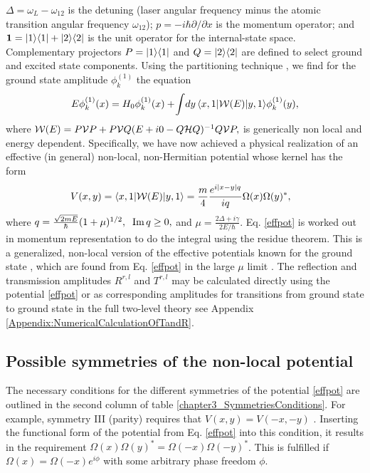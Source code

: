$\Delta=\omega_{L}-\omega_{12}$
is the detuning (laser angular frequency minus the atomic transition
angular frequency $\omega_{12}$);
${p}=-i\hbar\partial/\partial x$ is the momentum operator;
and ${\bf 1}=|1\rangle\langle 1|+|2\rangle\langle 2|$ is the unit operator
for the internal-state space.
Complementary projectors
%
$P=|1\rangle\langle 1|$ and $Q=|2\rangle\langle 2|$
%
are defined to select ground and excited state components.
Using the partitioning
technique \cite{Feshbach1958,Feshbach1962,Levine1969},
we find for the ground
state amplitude $\phi_k^{(1)}$ the equation
%
\begin{equation}\label{effecti}
	E\phi_k^{(1)}(x) = H_0\phi_k^{(1)}(x)+\!
	\int\! dy\, \la x,1|{\cal W}(E)|y,1\ra \phi_k^{(1)}(y),
\end{equation}
%
where
%
$
{\cal W}(E)=P{\cal V}P+P{\cal V}Q(E+i0-Q{\cal H}Q)^{-1}Q{\cal V}P,
$
%
is generically non local and energy dependent. Specifically, we have now achieved
a physical realization of an effective (in general) non-local, non-Hermitian potential whose kernel has the form
%
\begin{eqnarray}
	\hspace*{-.3cm}V (x,y) = \la x,1|{\cal W}(E)|y,1\ra = \frac{m}{4} \frac{e^{i|x-y|q}}{i q}
	\Omega(x)\Omega(y)^*,
	\label{effpot}
\end{eqnarray}
%
%
where
$
q=\frac{\sqrt{2mE}}{\hbar}(1+\mu)^{1/2},\;\;
{\rm Im}\,q\ge 0,
\label{qeq}
$ and
$
\mu=\frac{2\Delta+i\gamma}{2E/\hbar}.
$
%
Eq. \eqref{effpot} is worked out  in momentum representation to do the integral
using the residue theorem.
This is a generalized, non-local version of the effective potentials known for the ground state
\cite{Chudesnikov1991,Oberthaler1996}, which are found from Eq. \eqref{effpot}  in the large $\mu$ limit \cite{Ruschhaupt2004a}.
The reflection and transmission amplitudes $R^{r,l}$ and  $T^{r,l}$ may be calculated directly
using  the potential  \eqref{effpot} or as  corresponding amplitudes for
transitions from ground state to ground state in the full two-level theory see Appendix \ref{Appendix:NumericalCalculationOfTandR}.


%
\subsection{Possible symmetries of the non-local potential}
%
The necessary conditions for the different symmetries of the potential \eqref{effpot} are outlined in the second column of  table \ref{chapter3_SymmetriesConditions}. For example,
symmetry III (parity) requires that $V(x,y)=V(-x,-y)$ \cite{Ruschhaupt2017}. Inserting the functional form of the potential from Eq. \eqref{effpot} into this condition, it results in the requirement $\Omega(x) \Omega(y)^* = \Omega(-x) \Omega(-y)^*$. This is fulfilled if $\Omega(x)=\Omega(-x)e^{i \phi}$ with some arbitrary phase freedom $\phi$.

